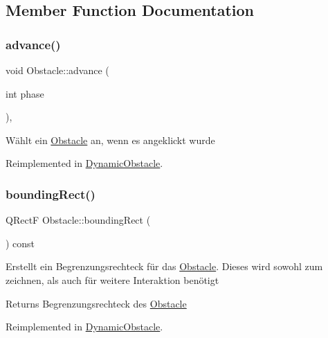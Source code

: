 \subsection{Member Function Documentation}
\mbox{\label{class_obstacle_ac3bcd488b16a8d8cf99875c6d0172e15}} 
\subsubsection{\texorpdfstring{advance()}{advance()}}
{\footnotesize\ttfamily void Obstacle\+::advance (\begin{DoxyParamCaption}\item[{int}]{phase }\end{DoxyParamCaption})\hspace{0.3cm}{\ttfamily [protected]}, {\ttfamily [virtual]}}

Wählt ein \mbox{\hyperlink{class_obstacle}{Obstacle}} an, wenn es angeklickt wurde 

Reimplemented in \mbox{\hyperlink{class_dynamic_obstacle_a533d0927fbe09aa105c47e00b1cd045f}{Dynamic\+Obstacle}}.

\mbox{\label{class_obstacle_a6f02b341e339ea27c3391a44c787b5f2}} 
\subsubsection{\texorpdfstring{bounding\+Rect()}{boundingRect()}}
{\footnotesize\ttfamily Q\+RectF Obstacle\+::bounding\+Rect (\begin{DoxyParamCaption}{ }\end{DoxyParamCaption}) const\hspace{0.3cm}{\ttfamily [virtual]}}

Erstellt ein Begrenzungsrechteck für das \mbox{\hyperlink{class_obstacle}{Obstacle}}. Dieses wird sowohl zum zeichnen, als auch für weitere Interaktion benötigt \begin{DoxyReturn}{Returns}
Begrenzungsrechteck des \mbox{\hyperlink{class_obstacle}{Obstacle}} 
\end{DoxyReturn}


Reimplemented in \mbox{\hyperlink{class_dynamic_obstacle_ac1b0b15d722a45decc8b77fcde22efd0}{Dynamic\+Obstacle}}.


